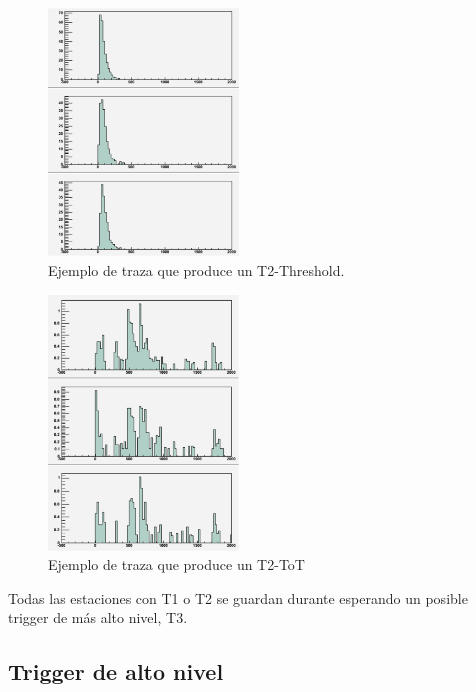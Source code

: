 			\begin{figure}[h!]
				\begin{center}
				\includegraphics[width=0.45\textwidth]{fig/detectorAuger/Threshold}
				\caption{\label{fig:t2_th} Ejemplo de traza que produce un T2-Threshold.}
				\end{center}
			\end{figure}
			\begin{figure}[h!]
				\begin{center}
				\includegraphics[width=0.45\textwidth]{fig/detectorAuger/ToT}
				\caption{\label{fig:t2_tot} Ejemplo de traza que produce un T2-ToT}
				\end{center}
			\end{figure}
			
			Todas las estaciones con T1 o T2 se guardan durante  esperando un posible trigger de m\'as alto nivel, T3.
			
			\subsection*{Trigger de alto nivel}
			
